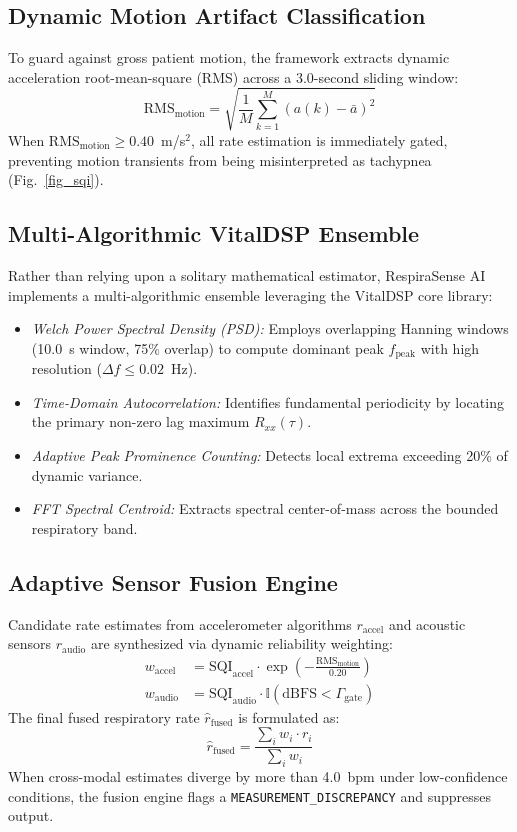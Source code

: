 \documentclass[journal]{IEEEtran}
\begin{document}
\subsection{Dynamic Motion Artifact Classification}
To guard against gross patient motion, the framework extracts dynamic acceleration root-mean-square (RMS) across a 3.0-second sliding window:
\begin{equation}
\text{RMS}_{\text{motion}} = \sqrt{ \frac{1}{M} \sum_{k=1}^M (a(k) - \bar{a})^2 }
\end{equation}
When $\text{RMS}_{\text{motion}} \ge 0.40$~m/s$^2$, all rate estimation is immediately gated, preventing motion transients from being misinterpreted as tachypnea (Fig.~\ref{fig_sqi}).

\subsection{Multi-Algorithmic VitalDSP Ensemble}
Rather than relying upon a solitary mathematical estimator, RespiraSense AI implements a multi-algorithmic ensemble leveraging the VitalDSP core library:
\begin{itemize}
    \item \textit{Welch Power Spectral Density (PSD):} Employs overlapping Hanning windows (10.0~s window, 75\% overlap) to compute dominant peak $f_{\text{peak}}$ with high resolution ($\Delta f \le 0.02$~Hz).
    \item \textit{Time-Domain Autocorrelation:} Identifies fundamental periodicity by locating the primary non-zero lag maximum $R_{xx}(\tau)$.
    \item \textit{Adaptive Peak Prominence Counting:} Detects local extrema exceeding 20\% of dynamic variance.
    \item \textit{FFT Spectral Centroid:} Extracts spectral center-of-mass across the bounded respiratory band.
\end{itemize}

\subsection{Adaptive Sensor Fusion Engine}
Candidate rate estimates from accelerometer algorithms $r_{\text{accel}}$ and acoustic sensors $r_{\text{audio}}$ are synthesized via dynamic reliability weighting:
\begin{align}
w_{\text{accel}} &= \text{SQI}_{\text{accel}} \cdot \exp\left(-\frac{\text{RMS}_{\text{motion}}}{0.20}\right) \\
w_{\text{audio}} &= \text{SQI}_{\text{audio}} \cdot \mathbb{I}(\text{dBFS} < \Gamma_{\text{gate}})
\end{align}
The final fused respiratory rate $\hat{r}_{\text{fused}}$ is formulated as:
\begin{equation}
\hat{r}_{\text{fused}} = \frac{\sum_i w_i \cdot r_i}{\sum_i w_i}
\end{equation}
When cross-modal estimates diverge by more than 4.0~bpm under low-confidence conditions, the fusion engine flags a \texttt{MEASUREMENT\_DISCREPANCY} and suppresses output.
\end{document}

